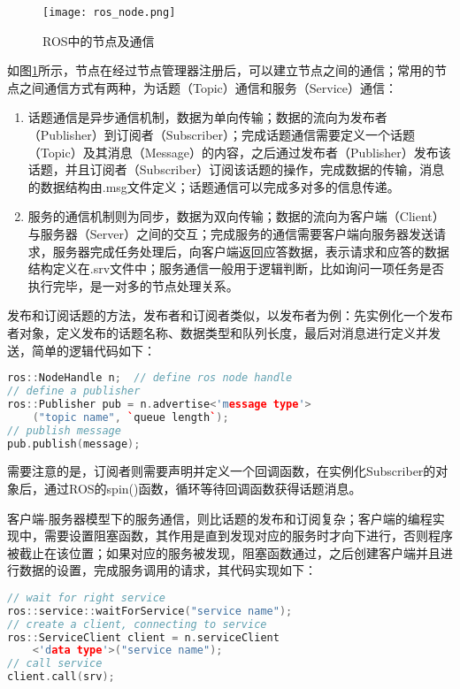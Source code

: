 \begin{figure}[!ht]
\centering
\texttt{[image: ros\_node.png]}
\caption{ROS中的节点及通信} 
\label{fig2}
\end{figure}

如图\ref{fig2}所示，节点在经过节点管理器注册后，可以建立节点之间的通信；常用的节点之间通信方式有两种，为话题（Topic）通信和服务（Service）通信：
\begin{enumerate}
	\item 话题通信是异步通信机制，数据为单向传输；数据的流向为发布者（Publisher）到订阅者（Subscriber）；完成话题通信需要定义一个话题（Topic）及其消息（Message）的内容，之后通过发布者（Publisher）发布该话题，并且订阅者（Subscriber）订阅该话题的操作，完成数据的传输，消息的数据结构由.msg文件定义；话题通信可以完成多对多的信息传递。
	\item 
	服务的通信机制则为同步，数据为双向传输；数据的流向为客户端（Client）与服务器（Server）之间的交互；完成服务的通信需要客户端向服务器发送请求，服务器完成任务处理后，向客户端返回应答数据，表示请求和应答的数据结构定义在.srv文件中；服务通信一般用于逻辑判断，比如询问一项任务是否执行完毕，是一对多的节点处理关系。
\end{enumerate}

发布和订阅话题的方法，发布者和订阅者类似，以发布者为例：先实例化一个发布者对象，定义发布的话题名称、数据类型和队列长度，最后对消息进行定义并发送，简单的逻辑代码如下：
\begin{lstlisting}[language={C++}]
ros::NodeHandle n;  // define ros node handle
// define a publisher
ros::Publisher pub = n.advertise<'message type'>
	("topic name", `queue length`);
// publish message
pub.publish(message);
\end{lstlisting}

需要注意的是，订阅者则需要声明并定义一个回调函数，在实例化Subscriber的对象后，通过ROS的spin()函数，循环等待回调函数获得话题消息。

客户端-服务器模型下的服务通信，则比话题的发布和订阅复杂；客户端的编程实现中，需要设置阻塞函数，其作用是直到发现对应的服务时才向下进行，否则程序被截止在该位置；如果对应的服务被发现，阻塞函数通过，之后创建客户端并且进行数据的设置，完成服务调用的请求，其代码实现如下：
\begin{lstlisting}[language={C++}]
// wait for right service
ros::service::waitForService("service name");
// create a client, connecting to service
ros::ServiceClient client = n.serviceClient
	<'data type'>("service name");
// call service
client.call(srv);
\end{lstlisting}

